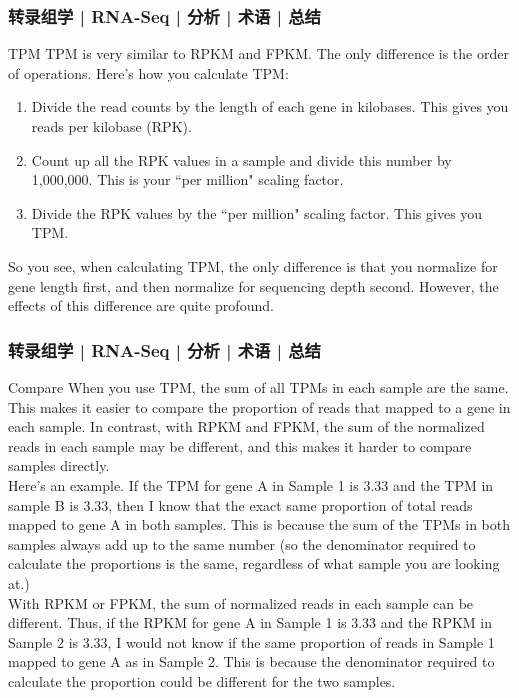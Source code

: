 \begin{frame}
  \frametitle{转录组学 | RNA-Seq | 分析 | 术语 | 总结}
  \begin{block}{TPM}
    TPM is very similar to RPKM and FPKM. The only difference is the order of operations. Here's how you calculate TPM:
    \begin{enumerate}
      \item Divide the read counts by the length of each gene in kilobases. This gives you reads per kilobase (RPK).
      \item Count up all the RPK values in a sample and divide this number by 1,000,000. This is your ``per million" scaling factor.
      \item Divide the RPK values by the ``per million" scaling factor. This gives you TPM.
    \end{enumerate}
    So you see, when calculating TPM, the only difference is that you normalize for gene length first, and then normalize for sequencing depth second. However, the effects of this difference are quite profound.
  \end{block}
\end{frame}

\begin{frame}
  \frametitle{转录组学 | RNA-Seq | 分析 | 术语 | 总结}
  {\footnotesize
  \begin{block}{Compare}
    When you use TPM, the sum of all TPMs in each sample are the same. This makes it easier to compare the proportion of reads that mapped to a gene in each sample. In contrast, with RPKM and FPKM, the sum of the normalized reads in each sample may be different, and this makes it harder to compare samples directly.\\
    \vspace{0.5em}
    Here's an example. If the TPM for gene A in Sample 1 is 3.33 and the TPM in sample B is 3.33, then I know that the exact same proportion of total reads mapped to gene A in both samples. This is because the sum of the TPMs in both samples always add up to the same number (so the denominator required to calculate the proportions is the same, regardless of what sample you are looking at.)\\
    \vspace{0.5em}
    With RPKM or FPKM, the sum of normalized reads in each sample can be different. Thus, if the RPKM for gene A in Sample 1 is 3.33 and the RPKM in Sample 2 is 3.33, I would not know if the same proportion of reads in Sample 1 mapped to gene A as in Sample 2. This is because the denominator required to calculate the proportion could be different for the two samples.
  \end{block}
  }
\end{frame}


